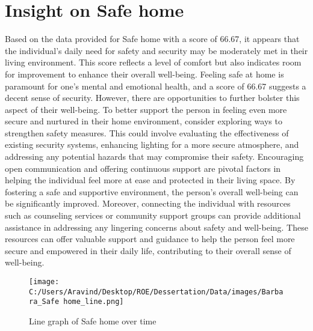 \documentclass[10pt, a4paper]{article}%
\begin{document}
\section{Insight on Safe home}%
\label{sec:InsightonSafehome}%
Based on the data provided for Safe home with a score of 66.67, it appears that the individual's daily need for safety and security may be moderately met in their living environment. This score reflects a level of comfort but also indicates room for improvement to enhance their overall well{-}being.\newline%
\newline%
Feeling safe at home is paramount for one's mental and emotional health, and a score of 66.67 suggests a decent sense of security. However, there are opportunities to further bolster this aspect of their well{-}being. \newline%
\newline%
To better support the person in feeling even more secure and nurtured in their home environment, consider exploring ways to strengthen safety measures. This could involve evaluating the effectiveness of existing security systems, enhancing lighting for a more secure atmosphere, and addressing any potential hazards that may compromise their safety.\newline%
\newline%
Encouraging open communication and offering continuous support are pivotal factors in helping the individual feel more at ease and protected in their living space. By fostering a safe and supportive environment, the person's overall well{-}being can be significantly improved.\newline%
\newline%
Moreover, connecting the individual with resources such as counseling services or community support groups can provide additional assistance in addressing any lingering concerns about safety and well{-}being. These resources can offer valuable support and guidance to help the person feel more secure and empowered in their daily life, contributing to their overall sense of well{-}being.%


\begin{figure}[H]%
\centering%
\texttt{[image: C:/Users/Aravind/Desktop/ROE/Dessertation/Data/images/Barbara\_Safe home\_line.png]}%
\caption{Line graph of Safe home over time}%
\end{figure}

%
\end{document}
